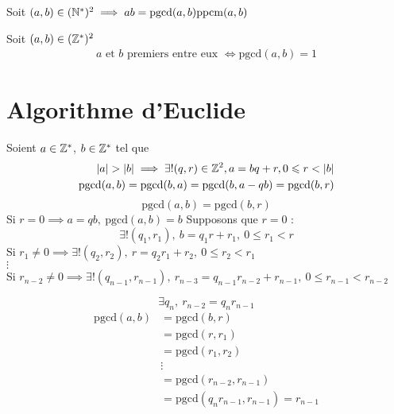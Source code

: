 \begin{theoreme}
Soit $(a, b) \in (\mathbb{N}^*)^2 \implies ab = \mathrm{pgcd}(a, b)\mathrm{ppcm}(a, b)$
\end{theoreme}

\begin{definition}
	Soit $(a, b) \in (\mathbb{Z}^*)^2$
	\begin{align*}
	a \text{ et } b \text{ premiers entre eux } \iff \mathrm{pgcd}(a, b) = 1
	\end{align*}
\end{definition}

\section{Algorithme d'Euclide}
\begin{proposition}
Soient $a \in \mathbb{Z}^*$, $b \in \mathbb{Z}^*$ tel que 
\begin{align*}
|a| > |b| \implies \exists ! (q, r) \in \mathbb{Z}^2, a = b q + r, 0 \leqslant r < |b| \\
\mathrm{pgcd}(a, b) = \mathrm{pgcd}(b, a) = \mathrm{pgcd}(b, a - qb) = \mathrm{pgcd}(b, r) \\
\end{align*}
\begin{equation*}
\mathrm{pgcd}(a, b) = \mathrm{pgcd}(b, r)
\end{equation*}
Si $r = 0 \implies a = q b,\ \mathrm{pgcd}(a, b) = b$ 
Supposons que $r = 0$ :
\begin{equation*}
\exists ! (q_1, r_1),\ b = q_1 r + r_1, \ 0 \leq r_1 < r
\end{equation*}
Si $r_1 \neq 0 \implies \exists ! (q_2, r_2),\ r = q_2 r_1 + r_2,\ 0 \leq r_2 < r_1$ \\
$\vdots$ \\
Si $r_{n - 2} \neq 0 \implies \exists ! (q_{n - 1}, r_{n - 1}),\ r_{n - 3} = q_{n-1}r_{n-2} + r_{n - 1},\ 0 \leq r_{n-1} < r_{n-2}$

\begin{equation*}
\exists q_n,\ r_{n-2} = q_n r_{n-1}
\end{equation*}
\begin{align*}
\mathrm{pgcd}(a, b) &= \mathrm{pgcd}(b, r) \\
				   &= \mathrm{pgcd}(r, r_1) \\
				   &= \mathrm{pgcd}(r_1, r_2) \\
				   &\vdots \\
				   &= \mathrm{pgcd}(r_{n-2}, r_{n-1}) \\
				   &= \mathrm{pgcd}(q_n r_{n-1}, r_{n-1}) = r_{n-1}
\end{align*}
\end{proposition}

